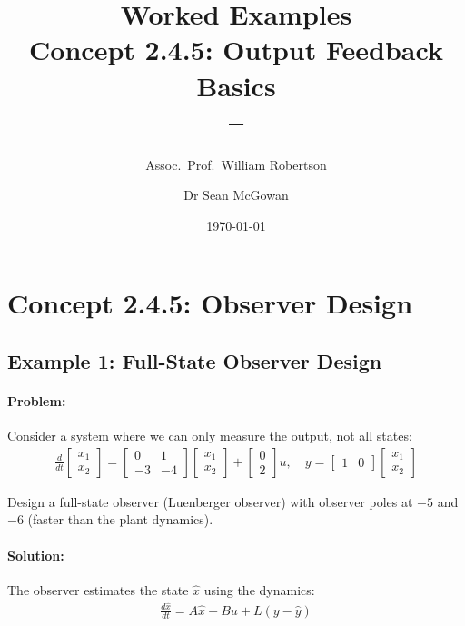 \documentclass[11pt,a4paper]{article}
\title{\textbf{Worked Examples}\\[0.5em]
\large Concept 2.4.5: Output Feedback Basics\\[0.3em]
\normalsize \coursesubtitle{} -- \coursetitle}
\author{Assoc.\ Prof.\ William Robertson \and Dr Sean McGowan}
\date{\today}
\begin{document}
\maketitle
\tableofcontents
\newpage

\section{Concept 2.4.5: Observer Design}

\subsection{Example 1: Full-State Observer Design}

\paragraph{Problem:} Consider a system where we can only measure the output, not all states:
\begin{align}
  \frac{d}{dt}\begin{bmatrix} x_1 \\ x_2 \end{bmatrix} = \begin{bmatrix} 0 & 1 \\ -3 & -4 \end{bmatrix}\begin{bmatrix} x_1 \\ x_2 \end{bmatrix} + \begin{bmatrix} 0 \\ 2 \end{bmatrix}u, \quad y = \begin{bmatrix} 1 & 0 \end{bmatrix}\begin{bmatrix} x_1 \\ x_2 \end{bmatrix}
\end{align}

Design a full-state observer (Luenberger observer) with observer poles at $-5$ and $-6$ (faster than the plant dynamics).

\paragraph{Solution:}

The observer estimates the state $\hat{x}$ using the dynamics:
\begin{align}
  \frac{d\hat{x}}{dt} = A\hat{x} + Bu + L(y - \hat{y})
\end{align}
\end{document}

